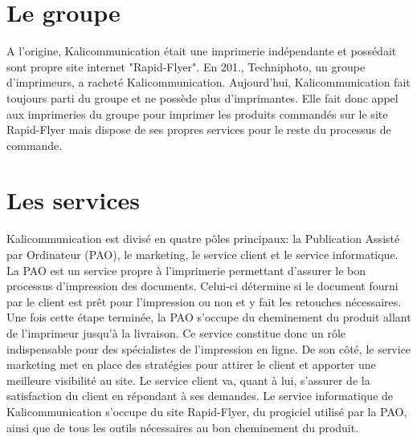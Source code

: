 
\section{Le groupe}
	A l'origine, Kalicommunication était une imprimerie indépendante et possédait sont propre site internet "Rapid-Flyer".\newline
	En 201., Techniphoto, un groupe d'imprimeurs, a racheté Kalicommunication. Aujourd'hui, Kalicommunication fait toujours parti du groupe et ne possède plus d'imprimantes. Elle fait donc appel aux imprimeries du groupe pour imprimer les produits commandés sur le site Rapid-Flyer mais dispose de ses propres services pour le reste du processus de commande.
\section{Les services}
	Kalicommunication est divisé en quatre pôles principaux: la Publication Assisté par Ordinateur (PAO), le marketing, le service client et le service informatique.\newline
	La PAO est un service propre à l'imprimerie permettant d'assurer le bon processus d'impression des documents. Celui-ci détermine si le document fourni par le client est prêt pour l'impression ou non et y fait les retouches nécessaires. Une fois cette étape terminée, la PAO s'occupe du cheminement du produit allant de l'imprimeur jusqu'à la livraison. Ce service constitue donc un rôle indispensable pour des spécialistes de l'impression en ligne.\newline
	De son côté, le service marketing met en place des stratégies pour attirer le client et apporter une meilleure visibilité au site.\newline
	Le service client va, quant à lui, s'assurer de la satisfaction du client en répondant à ses demandes.\newline
	Le service informatique de Kalicommunication s'occupe du site Rapid-Flyer, du progiciel utilisé par la PAO, ainsi que de tous les outils nécessaires au bon cheminement du produit.
